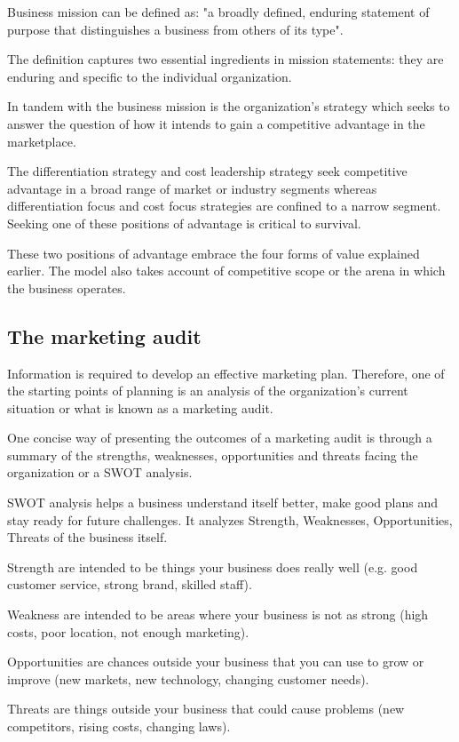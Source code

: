 \documentclass{article}
\begin{document}
Business mission can be defined as: "a broadly defined, enduring statement of purpose that distinguishes a business from others of its type".

The definition captures two essential ingredients in mission statements: they are enduring and specific to the individual organization. 

In tandem with the business mission is the organization's strategy which seeks to answer the question of how it intends to gain a competitive advantage in the marketplace.

The differentiation strategy and cost leadership strategy seek competitive advantage in a broad range of market or industry segments whereas differentiation focus and cost focus strategies are confined to a narrow segment. Seeking one of these positions of advantage is critical to survival. 

These two positions of advantage embrace the four forms of value explained earlier. The model also takes account of competitive scope or the arena in which the business operates.

\subsection{The marketing audit}
Information is required to develop an effective marketing plan. Therefore, one of the starting points of planning is an analysis of the organization's current situation or what is known as a marketing audit.

One concise way of presenting the outcomes of a marketing audit is through a summary of the strengths, weaknesses, opportunities and threats facing the organization or a SWOT analysis.

SWOT analysis helps a business understand itself better, make good plans and stay ready for future challenges. It analyzes Strength, Weaknesses, Opportunities, Threats of the business itself.

Strength are intended to be things your business does really well (e.g. good customer service, strong brand, skilled staff).

Weakness are intended to be areas where your business is not as strong (high costs, poor location, not enough marketing).

Opportunities are chances outside your business that you can use to grow or improve (new markets, new technology, changing customer needs).

Threats are things outside your business that could cause problems (new competitors, rising costs, changing laws).
\end{document}
